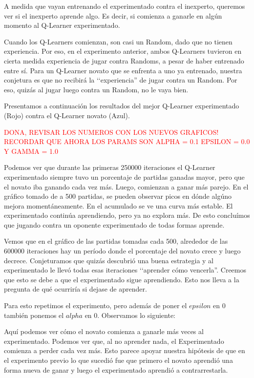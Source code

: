 A medida que vayan entrenando el experimentado contra el inexperto, queremos ver si el inexperto aprende algo. Es decir, si comienza a ganarle en algún momento al Q-Learner experimentado.

Cuando los Q-Learners comienzan, son casi un Random, dado que no tienen experiencia. Por eso, en el experimento anterior, ambos Q-Learners tuvieron en cierta medida experiencia de jugar contra Randoms, a pesar de haber entrenado entre sí. Para un Q-Learner novato que se enfrenta a uno ya entrenado, nuestra conjetura es que no recibirá la ‘‘experiencia'' de jugar contra un Random. Por eso, quizás al jugar luego contra un Random, no le vaya bien.

Presentamos a continuación los resultados del mejor Q-Learner experimentado (Rojo) contra el Q-Learner novato (Azul).



\textcolor{red}{DONA, REVISAR LOS NUMEROS CON LOS NUEVOS GRAFICOS! RECORDAR QUE AHORA LOS PARAMS SON ALPHA = 0.1 EPSILON = 0.0 Y GAMMA = 1.0}

Podemos ver que durante las primeras 250000 iteraciones el Q-Learner experimentado siempre tuvo un porcentaje de partidas ganadas mayor, pero que el novato iba ganando cada vez más. Luego, comienzan a ganar más parejo. En el gráfico tomado de a 500 partidas, se pueden observar picos en dónde algúno mejora momentáneamente. En el acumulado se ve una curva más estable. El experimentado continúa aprendiendo, pero ya no explora más. De esto concluímos que jugando contra un oponente experimentado de todas formas aprende.

Vemos que en el gráfico de las partidas tomadas cada 500, alrededor de las 600000 iteraciones hay un período donde el porcentaje del novato crece y luego decrece. Conjeturamos que quizás descubrió una buena estrategia y al experimentado le llevó todas esas iteraciones ‘‘aprender cómo vencerla''. Creemos que esto se debe a que el experimentado sigue aprendiendo. Esto nos lleva a la pregunta de qué ocurriría si dejase de aprender.

Para esto repetimos el experimento, pero además de poner el $epsilon$ en 0 también ponemos el $alpha$ en 0. Observamos lo siguiente:



Aquí podemos ver cómo el novato comienza a ganarle más veces al experimentado. Podemos ver que, al no aprender nada, el Experimentado comienza a perder cada vez más. Esto parece apoyar nuestra hipótesis de que en el experimento previo lo que sucedió fue que primero el novato aprendió una forma nueva de ganar y luego el experimentado aprendió a contrarrestarla.
